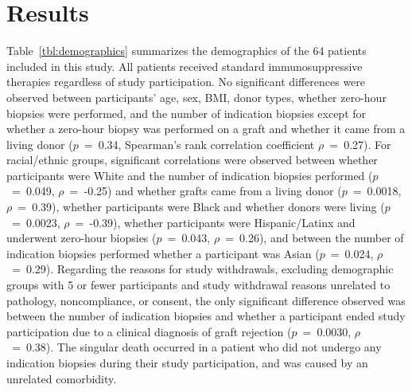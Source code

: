 \section{Results}

Table~\ref{tbl:demographics} summarizes the demographics of the 64 patients included in this study. All patients received standard immunosuppressive therapies regardless of study participation. No significant differences were observed between participants' age, sex, BMI, donor types, whether zero-hour biopsies were performed, and the number of indication biopsies except for whether a zero-hour biopsy was performed on a graft and whether it came from a living donor ($p$~=~0.34, Spearman's rank correlation coefficient $\rho$~=~0.27). For racial/ethnic groups, significant correlations were observed between whether participants were White and the number of indication biopsies performed ($p$~=~0.049, $\rho$~=~-0.25) and whether grafts came from a living donor ($p$~=~0.0018, $\rho$~=~0.39), whether participants were Black and whether donors were living ($p$~=~0.0023, $\rho$~=~-0.39), whether participants were Hispanic/Latinx and underwent zero-hour biopsies ($p$~=~0.043, $\rho$~=~0.26), and between the number of indication biopsies performed whether a participant was Asian ($p$~=~0.024, $\rho$~=~0.29). Regarding the reasons for study withdrawals, excluding demographic groups with 5 or fewer participants and study withdrawal reasons unrelated to pathology, noncompliance, or consent, the only significant difference observed was between the number of indication biopsies and whether a participant ended study participation due to a clinical diagnosis of graft rejection ($p$~=~0.0030, $\rho$~=~0.38). The singular death occurred in a patient who did not undergo any indication biopsies during their study participation, and was caused by an unrelated comorbidity.




